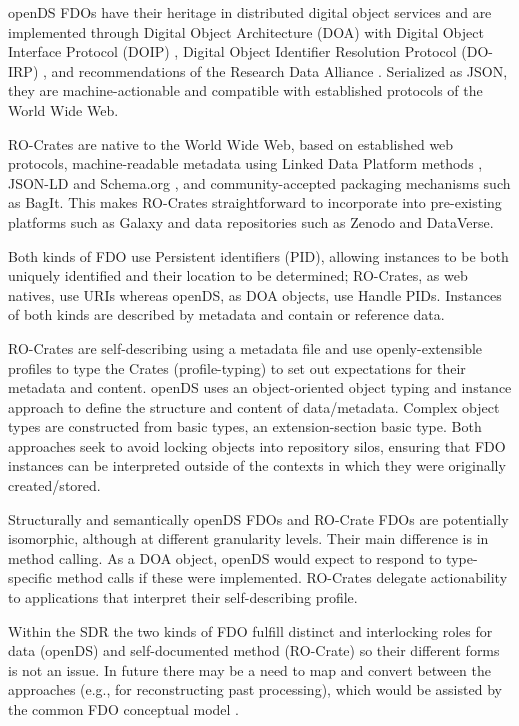 openDS FDOs have their heritage in distributed digital object services
\cite{ch8-46} and are implemented through Digital Object Architecture (DOA)
\cite{ch8-62} with Digital Object Interface Protocol (DOIP) \cite{DONA 2018}, Digital
Object Identifier Resolution Protocol (DO-IRP) \cite{rfc3652}, and
recommendations of the Research Data Alliance \cite{ch8-65}. Serialized as
JSON, they are machine-actionable and compatible with established
protocols of the World Wide Web.

RO-Crates are native to the World Wide Web, based on established web
protocols, machine-readable metadata using Linked Data Platform methods
\cite{ch8-66}, JSON-LD and Schema.org \cite{Bechhofer 2013}, and community-accepted
packaging mechanisms such as BagIt. This makes RO-Crates straightforward
to incorporate into pre-existing platforms such as Galaxy and data
repositories such as Zenodo and DataVerse.

Both kinds of FDO use Persistent identifiers (PID), allowing instances
to be both uniquely identified and their location to be determined;
RO-Crates, as web natives, use URIs whereas openDS, as DOA objects, use
Handle PIDs. Instances of both kinds are described by metadata and
contain or reference data.

RO-Crates are self-describing using a metadata file and use
openly-extensible profiles to type the Crates (profile-typing) to set
out expectations for their metadata and content. openDS uses an
object-oriented object typing and instance approach to define the
structure and content of data/metadata. Complex object types are
constructed from basic types, an extension-section basic type. Both
approaches seek to avoid locking objects into repository silos, ensuring
that FDO instances can be interpreted outside of the contexts in which
they were originally created/stored.

Structurally and semantically openDS FDOs and RO-Crate FDOs are
potentially isomorphic, although at different granularity levels. Their
main difference is in method calling. As a DOA object, openDS would
expect to respond to type-specific method calls if these were
implemented. RO-Crates delegate actionability to applications that
interpret their self-describing profile.

Within the SDR the two kinds of FDO fulfill distinct and interlocking
roles for data (openDS) and self-documented method (RO-Crate) so their
different forms is not an issue. In future there may be a need to map
and convert between the approaches (e.g., for reconstructing past
processing), which would be assisted by the common FDO conceptual model
\cite{bonino2019}.



